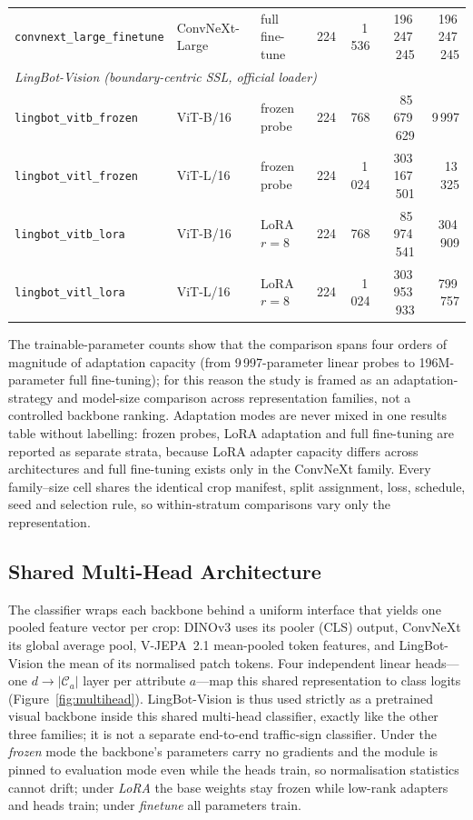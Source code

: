 \begin{table}[htbp]
{\begin{tabular}{llllrrr}
\texttt{convnext\_large\_finetune} & ConvNeXt-Large & full fine-tune & 224 & 1\,536 & 196\,247\,245 & 196\,247\,245 \\
\multicolumn{7}{l}{\emph{LingBot-Vision (boundary-centric SSL, official loader)}} \\
\texttt{lingbot\_vitb\_frozen} & ViT-B/16 & frozen probe & 224 & 768 & 85\,679\,629 & 9\,997 \\
\texttt{lingbot\_vitl\_frozen} & ViT-L/16 & frozen probe & 224 & 1\,024 & 303\,167\,501 & 13\,325 \\
\texttt{lingbot\_vitb\_lora} & ViT-B/16 & LoRA $r{=}8$ & 224 & 768 & 85\,974\,541 & 304\,909 \\
\texttt{lingbot\_vitl\_lora} & ViT-L/16 & LoRA $r{=}8$ & 224 & 1\,024 & 303\,953\,933 & 799\,757 \\
\hline
\end{tabular}}
\end{table}

The trainable-parameter counts show that the comparison spans four orders of magnitude of adaptation capacity (from 9\,997-parameter linear probes to 196M-parameter full fine-tuning); for this reason the study is framed as an adaptation-strategy and model-size comparison across representation families, not a controlled backbone ranking. Adaptation modes are never mixed in one results table without labelling: frozen probes, LoRA adaptation and full fine-tuning are reported as separate strata, because LoRA adapter capacity differs across architectures and full fine-tuning exists only in the ConvNeXt family. Every family--size cell shares the identical crop manifest, split assignment, loss, schedule, seed and selection rule, so within-stratum comparisons vary only the representation.

\subsection{Shared Multi-Head Architecture}

The classifier wraps each backbone behind a uniform interface that yields one pooled feature vector per crop: DINOv3 uses its pooler (CLS) output, ConvNeXt its global average pool, V-JEPA~2.1 mean-pooled token features, and LingBot-Vision the mean of its normalised patch tokens. Four independent linear heads---one $d \to |\mathcal{C}_a|$ layer per attribute $a$---map this shared representation to class logits (Figure~\ref{fig:multihead}). LingBot-Vision is thus used strictly as a pretrained visual backbone inside this shared multi-head classifier, exactly like the other three families; it is not a separate end-to-end traffic-sign classifier. Under the \emph{frozen} mode the backbone's parameters carry no gradients and the module is pinned to evaluation mode even while the heads train, so normalisation statistics cannot drift; under \emph{LoRA} the base weights stay frozen while low-rank adapters and heads train; under \emph{finetune} all parameters train.

